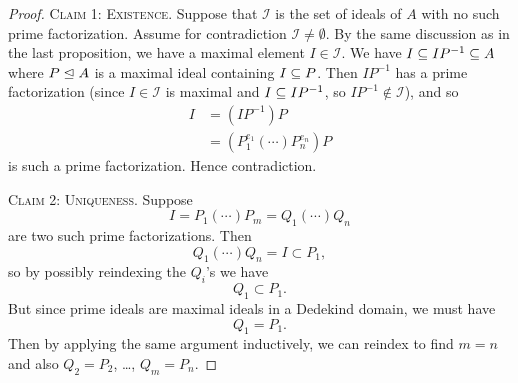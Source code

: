 \begin{proof}
\textsc{Claim 1: Existence}.
Suppose that $\mathcal{I}$ is the set of ideals of $A$ with no such
prime factorization. Assume for contradiction $\mathcal{I}\neq\emptyset$.
By the same discussion as in the last proposition, we have
a maximal element $I\in\mathcal{I}$. We have $I\propersubset IP^{-1}\subset A$
where $P\mathrel{\trianglelefteq} A$ is a maximal ideal containing $I\propersubset P$.
Then $IP^{-1}$ has a prime factorization (since $I\in\mathcal{I}$ is
maximal and $I\propersubset IP^{-1}$, so $IP^{-1}\notin\mathcal{I}$),
and so
\begin{subequations}
  \begin{align}
I &= (IP^{-1})P\\
&=(P_{1}^{e_{1}}(\cdots)P_{n}^{e_{n}})P
  \end{align}
\end{subequations}
is such a prime factorization. Hence contradiction.

\textsc{Claim 2: Uniqueness}. Suppose
\begin{equation}
I=P_{1}(\cdots)P_{m}=Q_{1}(\cdots)Q_{n}
\end{equation}
are two such prime factorizations. Then
\begin{equation}
Q_{1}(\cdots)Q_{n}=I\subset P_{1},
\end{equation}
so by possibly reindexing the $Q_{i}$'s we have
\begin{equation}
Q_{1}\subset P_{1}.
\end{equation}
But since prime ideals are maximal ideals in a Dedekind domain, we
must have
\begin{equation}
Q_{1}=P_{1}.
\end{equation}
Then by applying the same argument inductively, we can reindex to find
$m=n$ and also $Q_{2}=P_{2}$, \dots, $Q_{m}=P_{n}$.
\end{proof}